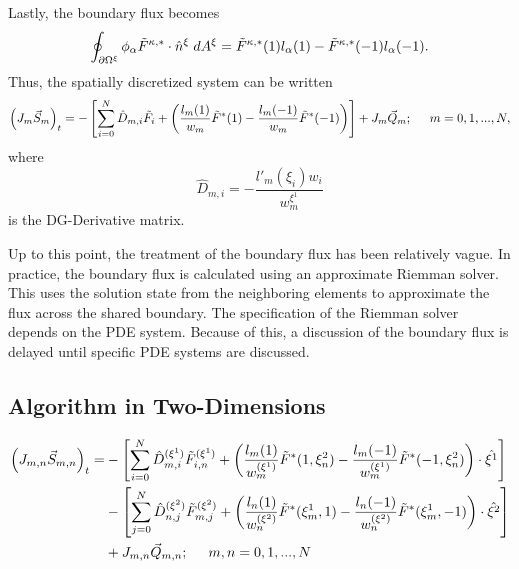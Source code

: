 \documentclass{softwaremanual}
\begin{document}
Lastly, the boundary flux becomes
\begin{equation}
\oint_{\partial \Omega^\xi} \phi_{\alpha}  \tilde{F}^{\kappa,*}  \cdot \hat{n}^\xi \hspace{1mm} d A^\xi = \tilde{F}^{\kappa,*}(1)l_\alpha(1) - \tilde{F}^{\kappa,*}(-1)l_\alpha(-1). 
\end{equation}
Thus, the spatially discretized system can be written
\begin{equation}
 \left( J_{m} \vec{S}_{m} \right)_t =  -\left[\sum_{i=0}^{N}\hat{D}_{m,i} \tilde{F}_{i}   + \left( \frac{ l_m(1)}{w_m} \tilde{F}^{*}(1) - \frac{ l_m(-1)}{w_m} \tilde{F}^{*}(-1) \right) \right] + J_{m}\vec{Q}_{m}; \hspace{5mm} m=0,1,...,N, \label{eq:discrete1d_system} 
\end{equation}
where
\begin{equation}
 \hat{D}_{m,i} = -\frac{l'_m(\xi_i)w_i}{w^{\xi^1}_m}
\end{equation}
is the DG-Derivative matrix. 

Up to this point, the treatment of the boundary flux has been relatively vague. In practice, the boundary flux is calculated using an approximate Riemman solver. This uses the solution state from the neighboring elements to approximate the flux across the shared boundary. The specification of the Riemman solver depends on the PDE system. Because of this, a discussion of the boundary flux is delayed until specific PDE systems are discussed.


\subsection{Algorithm in Two-Dimensions}\label{sec:DGSEM_2D}

 \begin{equation}
 \begin{split}
 \left( J_{m,n} \vec{S}_{m,n} \right)_t =  &-\left[\sum_{i=0}^{N}\hat{D}^{(\xi^1)}_{m,i} \tilde{F}^{(\xi^1)}_{i,n}   + \left( \frac{ l_m(1)}{w^{(\xi^1)}_m} \tilde{F}^{*}(1,\xi^2_n) - \frac{ l_m(-1)}{w^{(\xi^1)}_m} \tilde{F}^{*}(-1,\xi^2_n) \right) \cdot \hat{\xi^1} \right] \\
  &-\left[ \sum_{j=0}^{N}\hat{D}^{(\xi^2)}_{n,j} \tilde{F}^{(\xi^2)}_{m,j}  + \left( \frac{l_n(1)}{w^{(\xi^2)}_n} \tilde{F}^{*}(\xi^1_m,1)  -  \frac{l_n(-1)}{w^{(\xi^2)}_n} \tilde{F}^{*}(\xi^1_m,-1) \right)\cdot \hat{\xi^2}  \right] \\ 
 &+ J_{m,n}\vec{Q}_{m,n}; \hspace{5mm} m,n=0,1,...,N
\end{split} \label{eq:discrete2d_system} 
 \end{equation}
\end{document}
